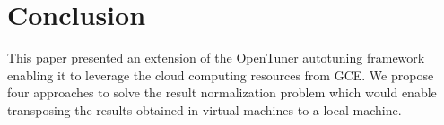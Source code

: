 \section{Conclusion} \label{sec:conclusion}

This paper presented an extension of the OpenTuner autotuning framework
enabling it to leverage the cloud computing resources from GCE.  We propose
four approaches to solve the result normalization problem which would enable
transposing the results obtained in virtual machines to a local machine.
